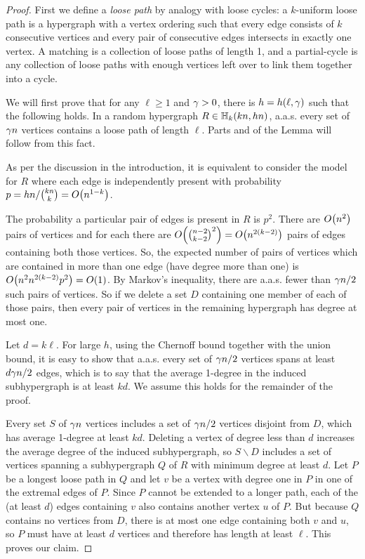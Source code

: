 \documentclass[11pt,english]{article}
\theoremstyle{plain}
\theoremstyle{definition}
\theoremstyle{definition}
\theoremstyle{plain}
\theoremstyle{plain}
\theoremstyle{plain}
\theoremstyle{plain}
\theoremstyle{remark}
\theoremstyle{remark}
\let\originalleft\left
\let\originalright\right
\renewcommand{\left}{\mathopen{}\mathclose\bgroup\originalleft}
\renewcommand{\right}{\aftergroup\egroup\originalright}
\begin{document}
\begin{proof}
First we define a \emph{loose path} by analogy with loose cycles:
a $k$-uniform loose path is a hypergraph with a vertex ordering such
that every edge consists of $k$ consecutive vertices and every pair
of consecutive edges intersects in exactly one vertex. A matching
is a collection of loose paths of length 1, and a partial-cycle is any
collection of loose paths with enough vertices left over to link them
together into a cycle.

We will first prove that for any $\ell\ge1$ and $\gamma>0$, there
is $h=h\left(\ell,\patheps\right)$ such that the following holds. In a
random hypergraph $R\in\HH_{k}\left(kn,hn\right)$,
a.a.s. every set of $\gamma n$ vertices contains a loose path of length
$\ell$. Parts  and  of the Lemma will follow from this fact.

As per the discussion in the introduction, it is equivalent to consider
the model for $R$ where each edge is independently present with probability
$p=hn/{kn \choose k}=O\left(n^{1-k}\right)$.

The probability a particular pair of edges is present in $R$ is $p^2$. There are $O\left(n^2\right)$ pairs of vertices and for each there are $O\left({n-2\choose k-2}^2\right)=
O\left(n^{2\left(k-2\right)}\right)$ pairs of edges containing both those vertices. So, the expected number of pairs of vertices
which are contained in more than one edge (have degree more than one)
is $O\left(n^2n^{2\left(k-2\right)}p^2\right)=O\left(1\right)$. By Markov's inequality, there are a.a.s. fewer
than $\gamma n/2$ such pairs of vertices. So if we delete a
set $D$ containing one member of each of those pairs, then every pair of vertices in the remaining hypergraph has
degree at most one.

Let $d=k\ell$. For
large $h$, using the Chernoff bound together with the union
bound, it is easy to show that a.a.s. every set of $\gamma n/2$ vertices spans at least $d\gamma n/2$
edges, which is to say that the average 1-degree in the induced subhypergraph
is at least $kd$. We assume this holds for the remainder of the proof.

Every set $S$ of $\gamma n$ vertices includes a set of $\gamma n/2$
vertices disjoint from $D$, which has average 1-degree at least $kd$.
Deleting a vertex of degree less than $d$ increases the average degree
of the induced subhypergraph, so $S\backslash D$ includes a set of
vertices spanning a subhypergraph $Q$ of $R$ with minimum degree
at least $d$. Let $P$ be a longest loose path in $Q$ and let $v$
be a vertex with degree one in $P$ in one of the extremal edges of $P$. Since $P$ cannot
be extended to a longer path, each of the (at least $d$) edges containing
$v$ also contains another vertex $u$ of $P$. But because $Q$ contains
no vertices from $D$, there is at most
one edge containing both $v$ and $u$, so $P$ must have at least
$d$ vertices and therefore has length at least $\ell$. This proves
our claim.


\end{proof}
\end{document}
